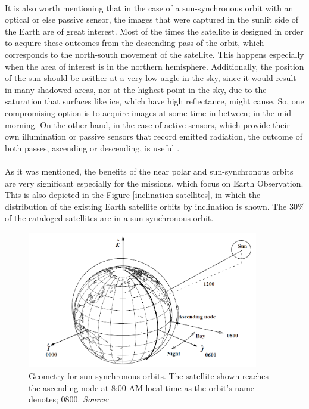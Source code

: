 \begin{itemize}
\begin{itemize}
	\\
	It is also worth mentioning that in the case of a sun-synchronous orbit with an optical or else passive sensor, the images that were captured in the sunlit side of the Earth are of great interest. Most of the times the satellite is designed in order to acquire these outcomes from the descending pass of the orbit, which corresponds to the north-south movement of the satellite. This happens especially when the area of interest is in the northern hemisphere. Additionally, the position of the sun should be neither at a very low angle in the sky, since it would result in many shadowed areas, nor at the highest point in the sky, due to the saturation that surfaces like ice, which have high reflectance, might cause. So, one compromising option is to acquire images at some time in between; in the mid-morning. %
	On the other hand, in the case of active sensors, which provide their own illumination or passive sensors that record emitted radiation, the outcome of both passes, ascending or descending, is useful \cite{Campbell}.\\
	\\
	As it was mentioned, the benefits of the near polar and sun-synchronous orbits are very significant especially for the missions, which focus on Earth Observation. This is also depicted in the Figure \ref{inclination-satellites}, in which the distribution of the existing Earth satellite orbits by inclination is shown. The 30\% of the cataloged satellites are in a sun-synchronous orbit.
	\end{itemize}
\end{itemize}

\begin{figure}
\centering
\includegraphics[width=0.9\textwidth]{Images/sso.png}\caption{Geometry for sun-synchronous orbits. The satellite shown reaches the ascending node at 8:00 AM local time as the orbit's name denotes; 0800. \textit{Source: \cite{Vallado}}}
\label{sso} 
\end{figure}


